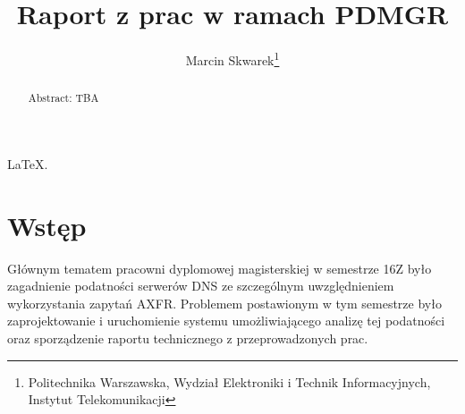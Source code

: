 \documentclass{superfri}
\begin{document}
\author{Marcin Skwarek\footnote{\label{susu}Politechnika Warszawska, Wydział Elektroniki i Technik Informacyjnych, Instytut Telekomunikacji}}

\title{Raport z prac w ramach PDMGR}

\maketitle{}

\begin{abstract}%
Abstract: TBA


\end{abstract}

\pagestyle{plain}
\LaTeX.
\section*{Wstęp}
\label{sec:intro}
Głównym tematem pracowni dyplomowej magisterskiej w semestrze 16Z było zagadnienie podatności serwerów DNS ze szczególnym uwzględnieniem wykorzystania zapytań AXFR. Problemem postawionym w tym semestrze było zaprojektowanie i uruchomienie systemu umożliwiającego analizę tej podatności oraz sporządzenie raportu technicznego z przeprowadzonych prac. 













\ack{}


\nocite{*}





\end{document}
